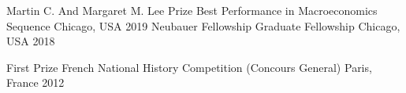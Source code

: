 

\begin{cvhonors}

    \cvhonor
    {Martin C. And Margaret M. Lee Prize} %
    {Best Performance in Macroeconomics Sequence} %
    {Chicago, USA} %
    {2019} %
    \cvhonor
    {Neubauer Fellowship} %
    {Graduate Fellowship} %
    {Chicago, USA} %
    {2018} %

    \cvhonor
    {First Prize} %
    {French National History Competition (Concours General)} %
    {Paris, France} %
    {2012} %

\end{cvhonors}

